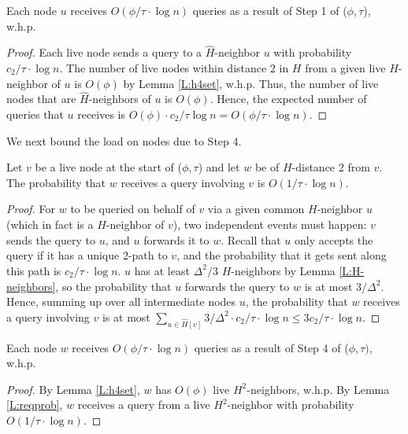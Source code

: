 \begin{lemma}
Each node $u$ receives $O(\phi/\tau \cdot \log n)$ queries as a result of Step 1 of ($\phi,\tau$), w.h.p.
\label{L:u-load}
\end{lemma}
\begin{proof}
Each live node sends a query to a $\hat{H}$-neighbor $u$ with probability $c_2/\tau \cdot \log n$. The number of live nodes within distance 2 in $H$ from a given live $H$-neighbor of $u$ is $O(\phi)$ by Lemma \ref{L:h4set}, w.h.p.
Thus, the number of live nodes that are $\hat{H}$-neighbors of $u$ is $O(\phi)$.
Hence, the expected number of queries that $u$ receives is $O(\phi) \cdot c_2/\tau \log n = O(\phi/\tau \cdot \log n)$.
\end{proof}

We next bound the load on nodes due to Step 4.

\begin{lemma}
Let $v$ be a live node at the start of ($\phi,\tau$) and let $w$ be of $H$-distance 2 from $v$.
The probability that $w$ receives a query involving $v$ is $O(1/\tau \cdot \log n)$.
\label{L:reqprob}
\end{lemma}

\begin{proof}
For $w$ to be queried on behalf of $v$ via a given common $H$-neighbor $u$ (which in fact is a $\hat{H}$-neighbor of $v$), two independent events must happen: $v$ sends the query to $u$, and $u$ forwards it to $w$. Recall that $u$ only accepts the query if it has a unique 2-path to $v$, and the probability that it gets sent along this path is $c_2/\tau \cdot \log n$. $u$ has at least $\Delta^2/3$ $H$-neighbors by Lemma \ref{L:H-neighbors}, so the probability that $u$ forwards the query to $w$ is at most $3/\Delta^2$. 
Hence, summing up over all intermediate nodes $u$, the probability that $w$ receives a query involving $v$ is at most $\sum_{u \in \hat{H}[v]} 3/\Delta^2 \cdot c_2/\tau \cdot \log n \le 3c_2/\tau \cdot \log n$.
\end{proof}

\begin{lemma}
Each node $w$ receives $O(\phi/\tau \cdot \log n)$ queries as a result of Step 4 of ($\phi,\tau)$, w.h.p.
\label{L:w-load}
\end{lemma}
\begin{proof}
By Lemma \ref{L:h4set}, $w$ has $O(\phi)$ live $H^2$-neighbors, w.h.p.
By Lemma \ref{L:reqprob}, $w$ receives a query from a live $H^2$-neighbor with probability $O(1/\tau \cdot \log n)$.
\end{proof}

